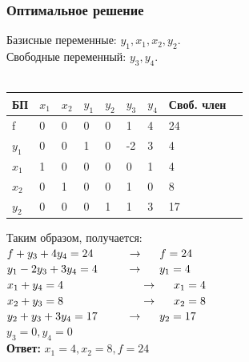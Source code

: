 \documentclass[14pt,a4paper,fleqn]{extarticle}
\begin{document}
\subsubsection*{Оптимальное решение}
Базисные переменные: $y_1, x_1, x_2, y_2$.\\
Свободные переменный: $y_3, y_4$.\\\\
\begin{tabularx}{\textwidth}{|p{1cm}|p{1cm}|p{1cm}|p{1cm}|p{1cm}|p{1cm}|p{1cm}|p{1.2cm}|c}
	\hline
	БП & $x_1$ & $x_2$ & $y_1$ & $y_2$ & $y_3$ & $y_4$ & Своб. член & \\
	\hline
	f & 0 & 0 & 0 & 0 & 1 & 4 & 24 & \\
	\hline
	$y_1$ & 0 & 0 & 1 & 0 & -2 & 3 & 4 & \\
	\hline
	$x_1$ & 1 & 0 & 0 & 0 & 0 & 1 & 4\\
	\hline
	$x_2$ & 0 & 1 & 0 & 0 & 1 & 0 & 8 \\
	\hline
	$y_2$ & 0 & 0 & 0 & 1 & 1 & 3 & 17\\
	\hline
\end{tabularx}
\newline\newline
Таким образом, получается:\\
$f + y_3 + 4y_4 = 24 \hspace*{1.05cm} \rightarrow \hspace*{0.5cm} f = 24$\\
$y_1 - 2y_3 + 3y_4 = 4 \hspace*{0.9cm} \rightarrow \hspace*{0.5cm} y_1 = 4$\\
$x_1 + y_4 = 4 \hspace*{2.42cm} \rightarrow \hspace*{0.5cm} x_1 = 4$\\
$x_2 + y_3 = 8 \hspace*{2.42cm} \rightarrow \hspace*{0.5cm} x_2 = 8$\\
$y_2 + y_3 + 3y_4 = 17 \hspace*{0.9cm} \rightarrow \hspace*{0.5cm} y_2 = 17$\\
$y_3 = 0, y_4 = 0$\\
\textbf{Ответ:} $x_1 = 4, x_2 = 8, f = 24$
\end{document}
